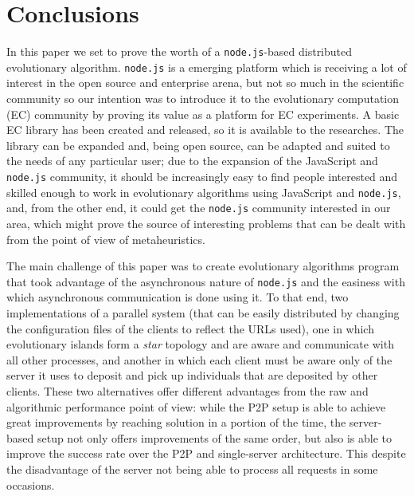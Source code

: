 \documentclass{sig-alternate}
\begin{document}


\section{Conclusions}

In this paper we set to prove the worth of a {\tt node.js}-based distributed
evolutionary algorithm. {\tt node.js} is a emerging platform which is
receiving a lot of interest in the open source and enterprise arena,
but not so much in the scientific community so our intention was to
introduce it to the evolutionary computation (EC) community by proving its
value as a platform for EC experiments. A basic EC library has been
created and released, so it is available to the researches. The
library can be expanded and, being open source, can be adapted and
suited to the needs of any particular user; due to the expansion of
the JavaScript and {\tt node.js} community, it should be increasingly easy
to find people interested and skilled enough to work in evolutionary
algorithms using JavaScript and {\tt node.js}, and, from the other end, it could get
the {\tt node.js} community interested in our area, which might prove the
source of interesting problems that can be dealt with from the point
of view of metaheuristics.

The main challenge of this paper was to create evolutionary algorithms
program that took advantage of the asynchronous nature of {\tt node.js} and
the easiness with which asynchronous communication is done using
it. To that end, two implementations of a parallel system (that can be
easily distributed by changing the configuration files of the clients
to reflect the URLs used), one in which evolutionary islands form a
{\em star} topology 
and are aware and communicate with all other
processes, and another in which each client must be aware only of the
server it uses to deposit and pick up individuals that are deposited
by other clients. These two alternatives offer different advantages
from the raw and algorithmic performance point of view: while the P2P
setup is able to achieve great improvements by reaching solution in a
portion of the time, the server-based setup not only offers
improvements of the same order, but also is able to improve the
success rate over the P2P and single-server architecture. This despite
the disadvantage of the server not being able to process all requests
in some occasions.
\end{document}
